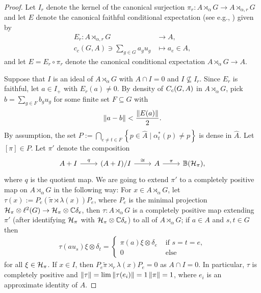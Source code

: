 \begin{proof}
	Let $I_r$ denote the kernel of the canonical surjection $ \pi_r \colon A \rtimes_\alpha G \to A \rtimes_{\alpha , r}G$ and let $E$ denote the canonical faithful conditional expectation (see e.g., \cite[Proposition 4.1.9]{brown2008c} ) given by
	\begin{align*}
	E_r \colon A \rtimes_{\alpha,r} G &\to A, \\ 
		c_c(G,A) \ni \sum_{g \in G} a_g  u_g &\mapsto a_e \in A,
	\end{align*}
	and let $E = E_r \circ \pi_r$ denote the canonical conditional expectation $A \rtimes_{\alpha }G \to A$.
	
	Suppose that $I$ is an ideal of $A \rtimes_\alpha G$ with $A \cap I=0$ and $I \not \subseteq I_r$. Since $E_r$ is faithful, let $a \in I_+$ with $E_r(a) \neq 0$. By density of $C_c(G,A)$ in $A \rtimes_\alpha G$, pick $b = \sum_{g \in F} b_g u_g$ for some finite set $F \subseteq G$ with
	\begin{align*}
		\left\lVert a - b \right\rVert < \frac{\left\lVert E (a) \right\rVert}{2}.
	\end{align*}
	By assumption, the set $P := \bigcap_{e \neq t \in F}\left\{ p \in \hat A \mid \alpha_{t}^*(p) \neq p \right\}$ is dense in $\hat A$. Let $[\pi] \in P$. Let $\pi'$ denote the composition
	\begin{equation*}
		\begin{tikzcd}
			A + I \ar[r, "q"] & (A+I)/I \ar[r, "\cong"] & A \ar[r, "\pi"]  & \mathbb{B}(\H_\pi),
		\end{tikzcd}
	\end{equation*}
	where $q$ is the quotient map. We are going to extend $\pi'$ to a completely positive map on $A \rtimes_\alpha G$ in the following way:	For $x \in A \rtimes_\alpha G$, let $\tau(x) := P _e(\tilde \pi \rtimes \lambda(x)) P_e$, where $P_e$ is the minimal projection $\mathcal{H}_\pi \otimes \ell^2(G) \to \mathcal{H}_\pi \otimes \mathbb{C} \delta_{e}$, then $\tau \colon A \rtimes_\alpha G$ is a completely positive map extending $\pi'$ (after identifying $\mathcal{H}_\pi$ with $\mathcal{H}_\pi \otimes \mathbb{C} \delta_e$) to all of $A \rtimes_\alpha G$; if $a \in A$ and $s,t \in G$ then
	\begin{align*}
		\tau(au_s) \xi \otimes \delta_t = \begin{cases}
			\pi(a) \xi \otimes \delta_e & \text{ if } s = t = e,\\
			0 & \text{ else}
		\end{cases}
	\end{align*}
	for all $\xi \in \mathcal{H}_\pi$. If $x \in I$, then $P_e \tilde \pi \rtimes_r \lambda (x) P_e = 0$ as $A \cap I = 0$. In particular, $\tau$ is completely positive and $\left\lVert \tau \right\rVert = \lim \left\lVert \tau(e_i)\right\rVert = 1\left\lVert \pi \right\rVert = 1$, where $e_i$ is an approximate identity of $A$. 
	

\end{proof}

